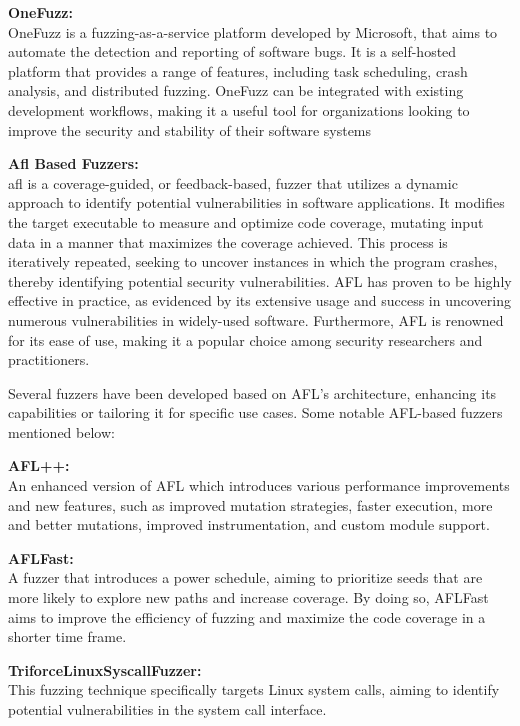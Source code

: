 \textbf{OneFuzz:\cite{GitHubmi60:online}}\\
OneFuzz is a fuzzing-as-a-service platform developed by Microsoft, that aims to
automate the detection and reporting of software bugs. It is a self-hosted
platform that provides a range of features, including task scheduling,
crash analysis, and distributed fuzzing. OneFuzz can be integrated with
existing development workflows, making it a useful tool for organizations
looking to improve the security and stability of their software systems

\textbf{Afl Based Fuzzers:}\\
\acrlong{afl} is a coverage-guided, or feedback-based, fuzzer that utilizes a
dynamic approach to identify potential vulnerabilities in software applications.
It modifies the target executable to measure and optimize code coverage,
mutating input data in a manner that maximizes the coverage achieved.
This process is iteratively repeated, seeking to uncover instances in
which the program crashes, thereby identifying potential security vulnerabilities.
AFL has proven to be highly effective in practice, as evidenced by its extensive
usage and success in uncovering numerous vulnerabilities in widely-used software.
Furthermore, AFL is renowned for its ease of use, making it a popular choice
among security researchers and practitioners\cite{american20:online}\cite{fuzzinga40:online}.

Several fuzzers have been developed based on AFL's architecture, enhancing its
capabilities or tailoring it for specific use cases. Some notable AFL-based
fuzzers mentioned below:

\textbf{AFL++:\cite{257204}\cite{GitHubAF78:online}} \\
An enhanced version of AFL which
introduces various performance improvements and new features, such as improved mutation strategies,
faster execution, more and better mutations, improved instrumentation, and custom module support.

\textbf{AFLFast:\cite{GitHubmb97:online}} \\
A fuzzer that introduces a power schedule, aiming to prioritize
seeds that are more likely to explore new paths and increase coverage.
By doing so, AFLFast aims to improve the efficiency of fuzzing and maximize
the code coverage in a shorter time frame\cite{bohme2016coverage}.

\textbf{TriforceLinuxSyscallFuzzer:\cite{GitHubnc62:online}} \\
This fuzzing technique specifically targets Linux system calls,
aiming to identify potential vulnerabilities in the system call interface.

